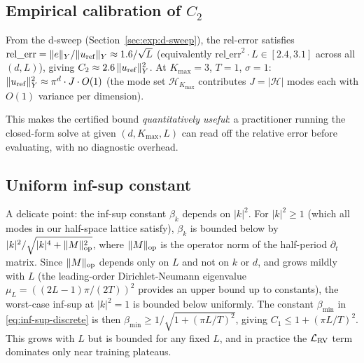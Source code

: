 \subsection{Empirical calibration of $C_2$}
\label{sec:thm:C-2}

From the d-sweep (Section~\ref{sec:exp:d-sweep}), the rel-error
satisfies
$\mathrm{rel\_err} = \|e\|_Y / \|u_{\rm ref}\|_Y \approx 1.6/\sqrt{L}$
(equivalently $\mathrm{rel\_err}^2 \cdot L \in [2.4, 3.1]$ across all
$(d, L)$), giving $C_2 \approx 2.6\,\|u_{\rm ref}\|_Y^2$. At
$K_{\max} = 3$, $T = 1$, $\sigma = 1$:
$\|u_{\rm ref}\|_Y^2 \approx \pi^d \cdot J \cdot O(1)$ (the mode set
$\mathcal{H}_{K_{\max}}$ contributes $J = |\mathcal{H}|$ modes each
with $O(1)$ variance per dimension).

This makes the certified bound \emph{quantitatively useful}: a
practitioner running the closed-form solve at given $(d, K_{\max}, L)$
can read off the relative error before evaluating, with no diagnostic
overhead.

\subsection{Uniform inf-sup constant}
\label{sec:thm:inf-sup-detail}

A delicate point: the inf-sup constant $\beta_k$ depends on $|k|^2$.
For $|k|^2 \ge 1$ (which all modes in our half-space lattice satisfy),
$\beta_k$ is bounded below by $|k|^2 / \sqrt{|k|^4 + \|M\|_{\rm op}^2}$,
where $\|M\|_{\rm op}$ is the operator norm of the
half-period $\partial_t$ matrix. Since $\|M\|_{\rm op}$ depends only
on $L$ and not on $k$ or $d$, and grows mildly with $L$ (the
leading-order Dirichlet-Neumann eigenvalue $\mu_L = ((2L-1)\pi/(2T))^2$
provides an upper bound up to constants), the worst-case inf-sup at
$|k|^2 = 1$ is bounded below uniformly. The constant $\beta_{\min}$
in \eqref{eq:inf-sup-discrete} is then
$\beta_{\min} \ge 1/\sqrt{1 + (\pi L/T)^2}$, giving
$C_1 \le 1 + (\pi L/T)^2$. This grows with $L$ but is bounded for any
fixed $L$, and in practice the $\mathcal{L}_{\rm RV}$ term dominates
only near training plateaus.
